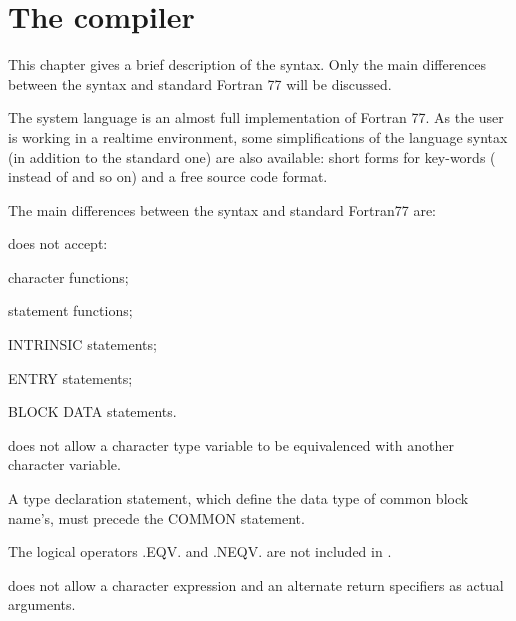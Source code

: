 \chapter{The \COMIS{} compiler}
 
This chapter gives a brief description of the \COMIS{} syntax.
Only the main differences between the \COMIS{} syntax and standard
Fortran 77 will be discussed.
 
The \COMIS{} system language is an almost full implementation of Fortran 77.
As the user is working in a realtime environment, some simplifications
of the language syntax (in addition to the standard one) are also
available: short forms for key-words
( instead of  and so on) and a free source code format.
 
The main differences between the \COMIS{} syntax and standard
Fortran77 are:
\begin{UL}
  \item \COMIS{} does not accept:
      \begin{UL}
        \item character functions;
        \item statement functions;
        \item INTRINSIC statements;
        \item ENTRY statements;
        \item BLOCK DATA statements.
      \end{UL}
  \item \COMIS{} does not allow a character type variable to be equivalenced
        with another character variable.
  \item A type declaration statement, which define the data type of
        common block name's, must precede the COMMON statement.
  \item The logical operators .EQV. and .NEQV. are not included
        in \COMIS{}.
  \item \COMIS{} does not allow a character expression and
        an alternate return specifiers as actual arguments.
\end{UL}

